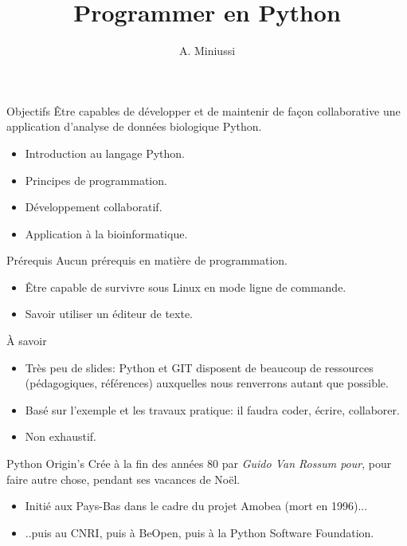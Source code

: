 \documentclass{beamer}
\title{Programmer en Python}
\author{A. Miniussi}
\institute{Observatoire de la Côte d'Azur}
\begin{document}
\begin{frame}
  \titlepage
\end{frame}

\begin{frame}{Objectifs}
  Être capables de développer et de maintenir de façon collaborative une application d'analyse de données biologique Python.
  
  \begin{itemize}
  \item Introduction au langage Python.
  \item Principes de programmation.
  \item Développement collaboratif.
  \item Application à la bio\-informatique. 
  \end{itemize}
\end{frame}

\begin{frame}{Prérequis}
  Aucun prérequis en matière de programmation.
  
  \begin{itemize}
  \item Être capable de survivre sous Linux en mode ligne de commande.
  \item Savoir utiliser un éditeur de texte.
  \end{itemize}
\end{frame}

\begin{frame}{À savoir}
  \begin{itemize}
  \item Très peu de slides: Python et GIT disposent de beaucoup de ressources (pédagogiques, références) auxquelles nous renverrons autant que possible.
  \item Basé sur l'exemple et les travaux pratique: il faudra coder, écrire, collaborer.
  \item Non exhaustif.
  \end{itemize}
\end{frame}

\begin{frame}{Python Origin's}
  Crée à la fin des années 80 par {\em Guido Van Rossum pour}, pour faire autre chose, pendant ses vacances de Noël.
  \begin{itemize}
  \item Initié aux Pays-Bas dans le cadre du projet Amobea (mort en 1996)...
  \item ..puis au CNRI, puis à BeOpen, puis à la Python Software Foundation.
  \end{itemize}
\end{frame}
\end{document}
